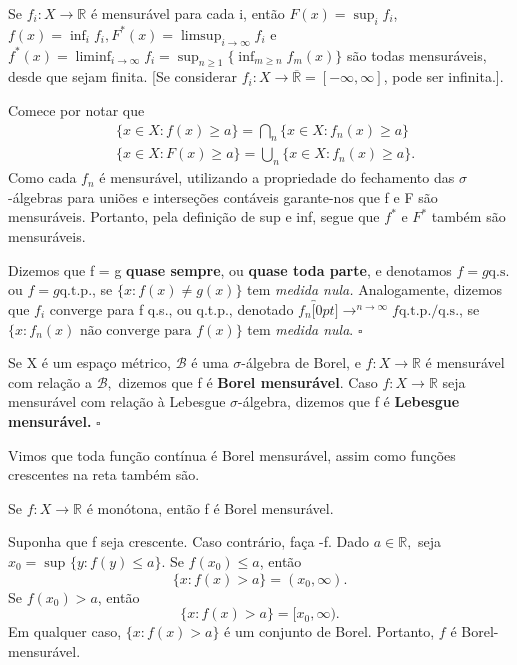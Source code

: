 \documentclass[measure_theory.tex]{subfiles}
\begin{document}
\begin{prop*}
	Se \(f_{i}:X\rightarrow \mathbb{R} \) é mensurável para cada i, então \(F(x) = \sup_{i}f_{i}\), \(f(x) = \inf_{i}f_{i}, F^{*}(x) = \limsup_{i\to \infty}f_{i}\)
	e \(f^{*}(x) = \liminf_{i\to \infty}f_{i} = \sup_{n\geq 1}\{\inf_{m\geq n}f_{m}(x)\}\) são todas mensuráveis, desde que sejam finita. [Se considerar \(f_{i}:X\rightarrow \overline{\mathbb{R}}=[-\infty, \infty]\), pode
	ser infinita.].
\end{prop*}
\begin{proof*}
	Comece por notar que
	\begin{align*}
		 & \{x\in X: f(x) \geq a\} = \bigcap_{n}^{}\{x\in X: f_{n}(x) \geq a\}  \\
		 & \{x\in X: F(x) \geq a\} = \bigcup_{n}^{}\{x\in X: f_{n}(x) \geq a\}.
	\end{align*}
	Como cada \(f_{n}\) é mensurável, utilizando a propriedade do fechamento das \(\sigma \)-álgebras para uniões e interseções contáveis garante-nos que f e F são mensuráveis. Portanto, pela definição de
	sup e inf, segue que \(f^{*}\) e \(F^{*}\) também são mensuráveis.
\end{proof*}
\begin{def*}
	Dizemos que f = g \textbf{quase sempre}, ou \textbf{quase toda parte}, e denotamos \(f= g \mathrm{q.s.}\) ou \(f = g \mathrm{q.t.p.}\), se \(\{x: f(x)\neq g(x)\}\) tem \textit{medida nula.} Analogamente, dizemos que
	\(f_{i}\) converge para f q.s., ou q.t.p., denotado \(f_{n}\overbracket[0pt]{\longrightarrow}^{n\to \infty}f \mathrm{q.t.p.}/\mathrm{q.s.}\), se \(\{x: f_{n}(x) \text{ não converge para }f(x)\}\) tem \textit{medida nula}. \(\square\)
\end{def*}
\begin{def*}
	Se X é um espaço métrico, \(\mathcal{B}\) é uma \(\sigma \)-álgebra de Borel, e \(f:X\rightarrow \mathbb{R}\) é mensurável com relação a \(\mathcal{B},\) dizemos que f é \textbf{Borel mensurável}. Caso \(f:X\rightarrow \mathbb{R}\) seja
	mensurável com relação à Lebesgue \(\sigma \)-álgebra, dizemos que f é \textbf{Lebesgue mensurável.} \(\square\)
\end{def*}
Vimos que toda função contínua é Borel mensurável, assim como funções crescentes na reta também são.
\begin{prop*}
	Se \(f:X\rightarrow \mathbb{R}\) é monótona, então f é Borel mensurável.
\end{prop*}
\begin{proof*}
	Suponha que f seja crescente. Caso contrário, faça -f. Dado \(a\in \mathbb{R},\) seja \(x_{0}=\sup_{}\{y:f(y) \leq a\}.\) Se \(f(x_{0}) \leq a\), então
	\[
		\{x: f(x) > a\} = (x_{0}, \infty).
	\]
	Se \(f(x_{0}) > a\), então
	\[
		\{x:f(x) > a\}  = [x_{0}, \infty).
	\]
	Em qualquer caso, \(\{x: f(x) > a\}\) é um conjunto de Borel. Portanto, \(f\) é Borel-mensurável. \qedsymbol
\end{proof*}
\end{document}
